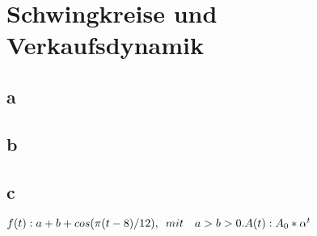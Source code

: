 \section{Schwingkreise und Verkaufsdynamik}

\subsection{a}
\subsection{b}
\subsection{c}
$
 f(t): a + b + cos(\pi(t-8)/12), \hspace{5pt} mit \hspace{10pt} a>b>0.
 \newline\newline
 A(t): A_0 * \alpha^t 
$

